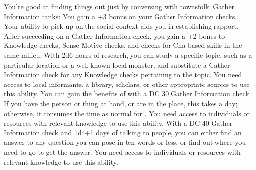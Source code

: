 \skillfeat
{You're good at finding things out just by conversing with townsfolk.}
{Gather Information ranks:}
{You gain a +3 bonus on your Gather Information checks.}
{Your ability to pick up on the social context aids you in establishing rapport. After succeeding on a Gather Information check, you gain a +2 bonus to Knowledge checks, Sense Motive checks, and checks for Cha-based skills in the same milieu.}
{With 2d6 hours of research, you can study a specific topic, such as a particular location or a well-known local monster, and substitute a Gather Information check for any Knowledge checks pertaining to the topic. You need access to local informants, a library, scholars, or other appropriate sources to use this ability.}
{You can gain the benefits of  with a DC 30 Gather Information check. If you have the person or thing at hand, or are in the place, this takes a day; otherwise, it consumes the time as normal for . You need access to individuals or resources with relevant knowledge to use this ability.}
{With a DC 40 Gather Information check and 1d4+1 days of talking to people, you can either find an answer to any question you can pose in ten words or less, or find out where you need to go to get the answer. You need access to individuals or resources with relevant knowledge to use this ability.}